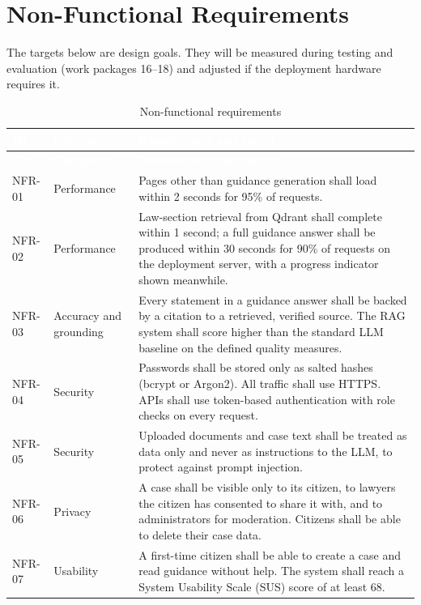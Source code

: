 \documentclass[12pt,a4paper]{report}
\newcommand{\thd}[1]{\textcolor{white}{\textbf{#1}}}
\newcommand{\headrow}{\rowcolor{tablehead}}
\begin{document}
\section{Non-Functional Requirements}\label{sec:nfr}
The targets below are design goals. They will be measured during testing and evaluation (work packages 16--18) and adjusted if the deployment hardware requires it.

\begin{longtable}{|p{1.5cm}|L{2.6cm}|L{10.1cm}|}
\caption{Non-functional requirements}\label{tab:nfr}\\
\hline\headrow \thd{ID} & \thd{Category} & \thd{Requirement and target} \\ \hline\endfirsthead
\hline\headrow \thd{ID} & \thd{Category} & \thd{Requirement and target} \\ \hline\endhead
NFR-01 & Performance & Pages other than guidance generation shall load within 2 seconds for 95\% of requests. \\ \hline
NFR-02 & Performance & Law-section retrieval from Qdrant shall complete within 1 second; a full guidance answer shall be produced within 30 seconds for 90\% of requests on the deployment server, with a progress indicator shown meanwhile. \\ \hline
NFR-03 & Accuracy and grounding & Every statement in a guidance answer shall be backed by a citation to a retrieved, verified source. The RAG system shall score higher than the standard LLM baseline on the defined quality measures. \\ \hline
NFR-04 & Security & Passwords shall be stored only as salted hashes (bcrypt or Argon2). All traffic shall use HTTPS. APIs shall use token-based authentication with role checks on every request. \\ \hline
NFR-05 & Security & Uploaded documents and case text shall be treated as data only and never as instructions to the LLM, to protect against prompt injection. \\ \hline
NFR-06 & Privacy & A case shall be visible only to its citizen, to lawyers the citizen has consented to share it with, and to administrators for moderation. Citizens shall be able to delete their case data. \\ \hline
NFR-07 & Usability & A first-time citizen shall be able to create a case and read guidance without help. The system shall reach a System Usability Scale (SUS) score of at least 68. \\ \hline

\end{longtable}
\end{document}
